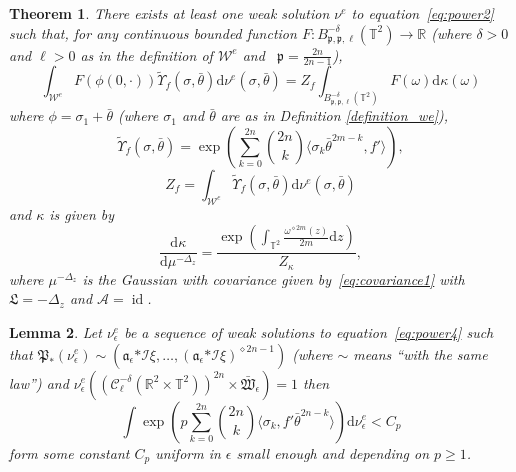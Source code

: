 \documentclass[a4paper,10pt]{article}
\newcommand{\asterisk}{\mathord{*}}
\newcommand{\mathd}{\mathrm{d}}
\newcommand{\tmop}[1]{\ensuremath{\operatorname{#1}}}
\newtheorem{theorem}{Theorem}
\newtheorem{lemma}[theorem]{Lemma}
\begin{document}
\begin{theorem}
  \label{theorem_polynomialreduction}There exists at least one weak solution
  $\nu^e$ to equation~{\eqref{eq:power2}} such that, for any continuous
  bounded function $F : B^{- \delta}_{\mathfrak{p}, \mathfrak{p}, \ell}
  (\mathbb{T}^2) \rightarrow \mathbb{R}$ (where $\delta > 0$ and $\ell > 0$ as
  in the definition of $\mathcal{W}^e$ and \ $\mathfrak{p} = \frac{2 n}{2 n -
  1}$),
  \begin{equation}
    \int_{\mathcal{W}^e} F (\phi (0, \cdot)) \tilde{\Upsilon}_f (\sigma,
    \bar{\theta}) \mathd \nu^e (\sigma, \bar{\theta}) = Z_f \int_{B^{-
    \delta}_{\mathfrak{p}, \mathfrak{p}, \ell} (\mathbb{T}^2)} F (\omega)
    \mathd \kappa (\omega) \label{eq:powermain}
  \end{equation}
  where $\phi = \sigma_1 + \bar{\theta}$ (where $\sigma_1$ and $\bar{\theta}$
  are as in Definition \ref{definition_we}),
  \[ \tilde{\Upsilon}_f (\sigma, \bar{\theta}) = \exp \left( \sum_{k = 0}^{2
     n} \binom{2 n}{k} \langle \sigma_k \bar{\theta}^{2 m - k}, f' \rangle
     \right), \]
  \[ Z_f = \int_{\mathcal{W}^e} \tilde{\Upsilon}_f (\sigma, \bar{\theta})
     \mathd \nu^e (\sigma, \bar{\theta}) \]
  and $\kappa$ is given by
  \[ \frac{\mathd \kappa}{\mathd \mu^{- \Delta_z}} = \frac{\exp \left(
     \int_{\mathbb{T}^2} \frac{\omega^{\diamond 2 m} (z)}{2 m} \mathd z
     \right)}{Z_{\kappa}}, \]
  where $\mu^{- \Delta_z}$ is the Gaussian with covariance given
  by~{\eqref{eq:covariance1}} with $\mathfrak{L} = - \Delta_z$ and
  $\mathcal{A} = \tmop{id}$.
\end{theorem}

\begin{lemma}
  \label{lemma_uniform}Let $\nu^e_{\epsilon}$ be a sequence of weak solutions
  to equation~{\eqref{eq:power4}} such that $\mathfrak{P}_{\asterisk}
  (\nu_{\epsilon}^e) \sim (\mathcal{\mathfrak{a}}_{\epsilon} \asterisk
  \mathcal{I} \xi, \ldots, (\mathcal{\mathfrak{a}}_{\epsilon} \asterisk
  \mathcal{I} \xi)^{\diamond 2 n - 1})$ (where $\sim$ means ``with the same
  law'') and $\nu^e_{\epsilon} ((\mathcal{C}^{- \delta}_{\ell} (\mathbb{R}^2
  \times \mathbb{T}^2))^{2 n} \times \mathfrak{\bar{W}}_{\epsilon}) = 1$ then
  \[ \int \exp \left( p \sum_{k = 0}^{2 n} \binom{2 n}{k} \langle \sigma_k,
     f'  \bar{\theta}^{2 n - k} \rangle \right) \mathd \nu_{\epsilon}^e < C_p
  \]
  form some constant $C_p$ uniform in $\epsilon$ small enough and depending on
  $p \geq 1$.
\end{lemma}
\end{document}
